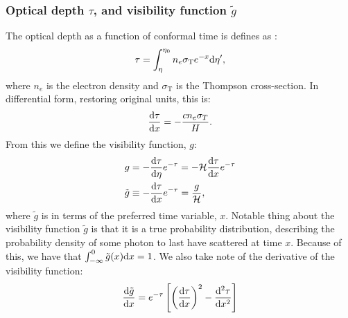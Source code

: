 \subsubsection{Optical depth $\tau$, and visibility function $\tilde{g}$}\label{sec:m2:theory:optical_depth}
    The optical depth as a function of conformal time is defines as \cite{AST5220LectureNotes}:
    \begin{equation}\label{eq:m2:theory:optical_depth}
        \tau = \int_\eta^{\eta_0} n_e\sigma_\mathrm{T}e^{-x}\mathrm{d}\eta',
    \end{equation}
    where $n_e$ is the electron density and $\sigma_\mathrm{T}$ is the Thompson cross-section. In differential form, restoring original units, this is:
    \begin{equation}\label{eq:m2:theory:optical_depth_differential}
        \dv{\tau}{x} = -\frac{cn_e\sigma_T}{H}.    
    \end{equation} 
    From this we define the visibility function, $g$:
    \begin{equation}\label{eq:m2:theory:visibility_function}
        \begin{split}
            g &= -\dv{\tau}{\eta}e^{-\tau} = -\mathcal{H}\dv{\tau}{x}e^{-\tau}\\
            \tilde{g} &\equiv -\dv{\tau}{x}e^{-\tau} = \frac{g}{\mathcal{H}},
        \end{split}
    \end{equation}
    where $\tilde{g}$ is in terms of the preferred time variable, $x$. Notable thing about the visibility function $\tilde{g}$ is that it is a true probability distribution, describing the probability density of some photon to last have scattered at time $x$. Because of this, we have that $\int_{-\infty}^0\tilde{g}(x)\mathrm{d} x = 1$. We also take note of the derivative of the visibility function:
    \begin{equation}\label{eq:m2:theory:visibility_function_deriv}
        \dv{\tilde{g}}{x} = e^{-\tau}\left[\left(\dv{\tau}{x}\right)^2-\dv[2]{\tau}{x}\right]
    \end{equation}
